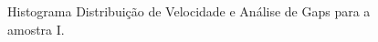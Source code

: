 \begin{anexosenv}
\begin{figure}[H]
\caption{Histograma Distribuição de Velocidade e Análise de Gaps para a amostra I.}
\label{fig:distrotation}%
\end{figure}


\end{anexosenv}
